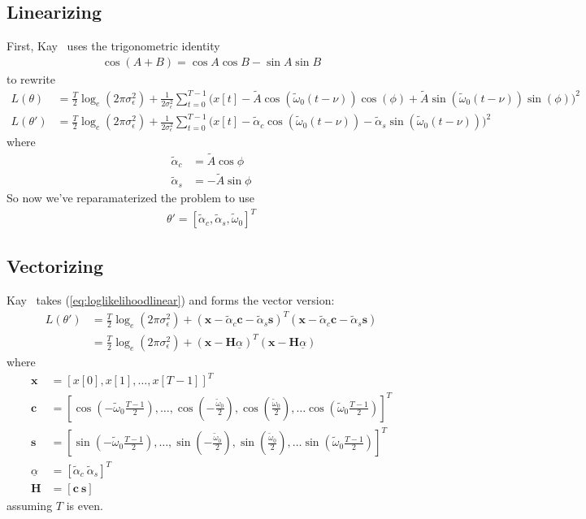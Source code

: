 \documentclass[11pt]{article}
\newcommand{\bc}{\mathbf{c}}
\newcommand{\bs}{\mathbf{s}}
\newcommand{\bx}{\mathbf{x}}
\newcommand{\bH}{\mathbf{H}}
\begin{document}
\subsection{Linearizing}

First, Kay~\cite{Kay1997} uses the trigonometric identity
\begin{align}
\cos(A + B) = \cos A \cos B - \sin A \sin B
\end{align}
to rewrite 
\begin{align}
L(\theta)   &= \frac{T}{2}\log_e(2\pi \sigma_\epsilon^2)  + \frac{1}{2\sigma_\epsilon^2} \sum_{t=0}^{T-1} \big(x[t] - \tilde{A} \cos(\tilde{\omega}_0(t-\nu) )\cos(\phi) + \tilde{A} \sin(\tilde{\omega}_0(t-\nu) )\sin(\phi)   \big)^2 \\
L(\theta') &= \frac{T}{2}\log_e(2\pi \sigma_\epsilon^2)  + \frac{1}{2\sigma_\epsilon^2} \sum_{t=0}^{T-1} \big(x[t] - \tilde{\alpha}_c \cos(\tilde{\omega}_0(t-\nu) ) - \tilde{\alpha}_s \sin(\tilde{\omega}_0(t-\nu) )   \big)^2\label{eq:loglikelihoodlinear}
\end{align}
where
\begin{align}
\tilde{\alpha}_c &= \tilde{A} \cos \phi\\
\tilde{\alpha}_s &= -\tilde{A} \sin \phi
\end{align}
So now we've reparamaterized the problem to use
\begin{align}
\theta' = \left [ \tilde{\alpha}_c, \tilde{\alpha}_s, \tilde{\omega}_0\right]^T
\end{align}

\subsection{Vectorizing}

Kay~\cite{Kay1997} takes (\ref{eq:loglikelihoodlinear}) and forms the vector version:
\begin{align}
L(\theta') &=  \frac{T}{2}\log_e(2\pi \sigma_\epsilon^2)  + (\bx  -\tilde{\alpha}_c \bc - \tilde{\alpha}_s \bs )^T  (\bx  -\tilde{\alpha}_c \bc - \tilde{\alpha}_s \bs )\\
&=  \frac{T}{2}\log_e(2\pi \sigma_\epsilon^2)  + (\bx - \bH\underline{\alpha} )^T  (\bx  - \bH \underline{\alpha} )
\end{align}
where
\begin{align}
\bx &= \left [ x[0], x[1], \ldots, x[T-1]  \right]^T\\
\bc &= \left [ \cos\left(-\tilde{\omega}_0 \frac{T-1}{2}\right), \ldots , \cos(-\frac{\tilde{\omega}_0}{2}), \cos(\frac{\tilde{\omega}_0}{2}),   \ldots \cos\left(\tilde{\omega}_0 \frac{T-1}{2}\right) \right]^T\\
\bs &= \left [ \sin\left(-\tilde{\omega}_0 \frac{T-1}{2}\right), \ldots , \sin(-\frac{\tilde{\omega}_0}{2}), \sin(\frac{\tilde{\omega}_0}{2}),   \ldots \sin\left(\tilde{\omega}_0 \frac{T-1}{2}\right) \right]^T\\
\underline{\alpha} &= \left[ \tilde{\alpha}_c\ \tilde{\alpha}_s\right ]^T\\
\bH &= \left [ \bc \ \bs \right ]
\end{align}
assuming $T$ is even.
\end{document}
